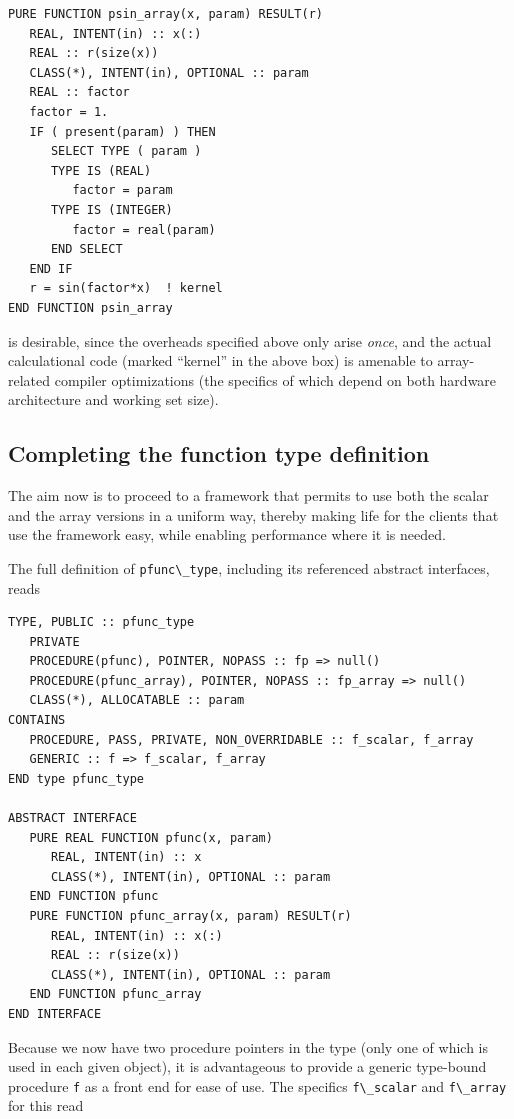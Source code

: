 \documentclass[
  paper=a4,
  ,captions=tableheading
]{scrartcl}
\newcommand{\passthrough}[1]{#1}
\begin{document}
\begin{lstlisting}
PURE FUNCTION psin_array(x, param) RESULT(r)
   REAL, INTENT(in) :: x(:)
   REAL :: r(size(x))
   CLASS(*), INTENT(in), OPTIONAL :: param
   REAL :: factor
   factor = 1.
   IF ( present(param) ) THEN
      SELECT TYPE ( param )
      TYPE IS (REAL)
         factor = param
      TYPE IS (INTEGER)
         factor = real(param)
      END SELECT
   END IF
   r = sin(factor*x)  ! kernel
END FUNCTION psin_array
\end{lstlisting}

is desirable, since the overheads specified above only arise
\emph{once}, and the actual calculational code (marked ``kernel'' in the
above box) is amenable to array-related compiler optimizations (the
specifics of which depend on both hardware architecture and working set
size).

\subsection{Completing the function type
definition}\label{completing-the-function-type-definition}

The aim now is to proceed to a framework that permits to use both the
scalar and the array versions in a uniform way, thereby making life for
the clients that use the framework easy, while enabling performance
where it is needed.

The full definition of \passthrough{\lstinline!pfunc\_type!}, including
its referenced abstract interfaces, reads

\begin{lstlisting}
TYPE, PUBLIC :: pfunc_type
   PRIVATE
   PROCEDURE(pfunc), POINTER, NOPASS :: fp => null()
   PROCEDURE(pfunc_array), POINTER, NOPASS :: fp_array => null()
   CLASS(*), ALLOCATABLE :: param
CONTAINS
   PROCEDURE, PASS, PRIVATE, NON_OVERRIDABLE :: f_scalar, f_array
   GENERIC :: f => f_scalar, f_array
END type pfunc_type

ABSTRACT INTERFACE
   PURE REAL FUNCTION pfunc(x, param)
      REAL, INTENT(in) :: x
      CLASS(*), INTENT(in), OPTIONAL :: param
   END FUNCTION pfunc
   PURE FUNCTION pfunc_array(x, param) RESULT(r)
      REAL, INTENT(in) :: x(:)
      REAL :: r(size(x))
      CLASS(*), INTENT(in), OPTIONAL :: param
   END FUNCTION pfunc_array
END INTERFACE
\end{lstlisting}

Because we now have two procedure pointers in the type (only one of
which is used in each given object), it is advantageous to provide a
generic type-bound procedure \passthrough{\lstinline!f!} as a front end
for ease of use. The specifics \passthrough{\lstinline!f\_scalar!} and
\passthrough{\lstinline!f\_array!} for this read
\end{document}

